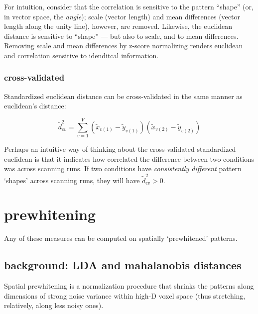 \documentclass{article}\usepackage[]{graphicx}\usepackage[]{color}
\begin{document}
For intuition, consider that the correlation is sensitive to the pattern ``shape'' (or, in vector space, the \textit{angle}); scale (vector length) and mean differences (vector length along the unity line), however, are removed.
Likewise, the euclidean distance is sensitive to ``shape'' --- but also to scale, and to mean differences.
Removing scale and mean differences by z-score normalizing renders euclidean and correlation sensitive to idenditcal information.

\subsubsection*{cross-validated}

Standardized euclidean distance can be cross-validated in the same manner as euclidean's distance:

\begin{equation}
  \widetilde{d}^2_\textit{cv} = \sum_{v = 1}^{V}(\widetilde{x}_{v(1)} - \widetilde{y}_{v(1)})(\widetilde{x}_{v(2)} - \widetilde{y}_{v(2)})
\end{equation}

Perhaps an intuitive way of thinking about the cross-validated standardized euclidean is that it indicates how correlated the difference between two conditions was across scanning runs.
If two conditions have \textit{consistently different} pattern `shapes' across scanning runs, they will have $\widetilde{d}^2_\textit{cv} > 0$.

\section*{prewhitening}

Any of these measures can be computed on spatially `prewhitened' patterns.

\subsection*{background: LDA and mahalanobis distances}

Spatial prewhitening is a normalization procedure that shrinks the patterns along dimensions of strong noise variance within high-D voxel space (thus stretching, relatively, along less noisy ones).
\end{document}

